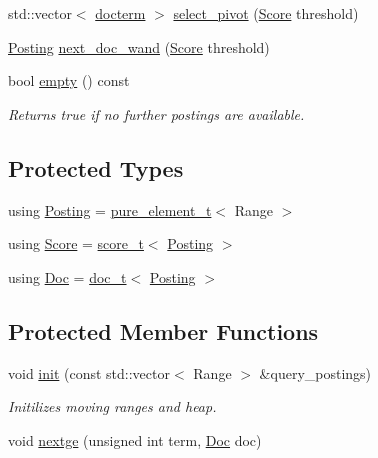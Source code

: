 \begin{DoxyCompactItemize}
std\+::vector$<$ \hyperlink{structirkit_1_1UnionRange_1_1docterm}{docterm} $>$ \hyperlink{classirkit_1_1UnionRange_aacb1050fb1d624260c4013f4ba1939a6}{select\+\_\+pivot} (\hyperlink{classirkit_1_1UnionRange_a47fb098a85581f5e33f4203e16245dae}{Score} threshold)
\item 
\hyperlink{classirkit_1_1UnionRange_a5f694970419f5a60d7fd41d740556229}{Posting} \hyperlink{classirkit_1_1UnionRange_a6f6bf3aa9d7d273371a9477b88c54737}{next\+\_\+doc\+\_\+wand} (\hyperlink{classirkit_1_1UnionRange_a47fb098a85581f5e33f4203e16245dae}{Score} threshold)
\item 
bool \hyperlink{classirkit_1_1UnionRange_af12b028d791c9d9821c17ae30084fa86}{empty} () const
\begin{DoxyCompactList}\small\item\em Returns true if no further postings are available. \end{DoxyCompactList}\end{DoxyCompactItemize}
\subsection*{Protected Types}
\begin{DoxyCompactItemize}
\item 
using \hyperlink{classirkit_1_1UnionRange_a5f694970419f5a60d7fd41d740556229}{Posting} = \hyperlink{namespaceirkit_afcffab67300c5c703cb38a363c9a6f1d}{pure\+\_\+element\+\_\+t}$<$ Range $>$
\item 
using \hyperlink{classirkit_1_1UnionRange_a47fb098a85581f5e33f4203e16245dae}{Score} = \hyperlink{namespaceirkit_a754dabe3346f950c948e7596d9d46c71}{score\+\_\+t}$<$ \hyperlink{classirkit_1_1UnionRange_a5f694970419f5a60d7fd41d740556229}{Posting} $>$
\item 
using \hyperlink{classirkit_1_1UnionRange_a387589b1f09868b60485c4ab8c61f97a}{Doc} = \hyperlink{namespaceirkit_a595d83053e112c98ab2a1b65e5dd74be}{doc\+\_\+t}$<$ \hyperlink{classirkit_1_1UnionRange_a5f694970419f5a60d7fd41d740556229}{Posting} $>$
\end{DoxyCompactItemize}
\subsection*{Protected Member Functions}
\begin{DoxyCompactItemize}
\item 
void \hyperlink{classirkit_1_1UnionRange_aabdf133213056f20e0526c6736dbff3e}{init} (const std\+::vector$<$ Range $>$ \&query\+\_\+postings)
\begin{DoxyCompactList}\small\item\em Initilizes moving ranges and heap. \end{DoxyCompactList}\item 
void \hyperlink{classirkit_1_1UnionRange_ab0548ed7d94aece8f72d0ca4db65b456}{nextge} (unsigned int term, \hyperlink{classirkit_1_1UnionRange_a387589b1f09868b60485c4ab8c61f97a}{Doc} doc)
\end{DoxyCompactItemize}
